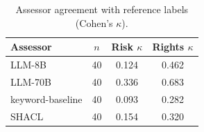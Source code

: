 \begin{table}[htbp]
\centering
\caption{Assessor agreement with reference labels (Cohen's $\kappa$).}
\label{tab:assessor_vs_gt}
\begin{tabular}{lccc}
\toprule
Assessor & $n$ & Risk $\kappa$ & Rights $\kappa$ \\
\midrule
LLM-8B & 40 & 0.124 & 0.462 \\
LLM-70B & 40 & 0.336 & 0.683 \\
keyword-baseline & 40 & 0.093 & 0.282 \\
SHACL & 40 & 0.154 & 0.320 \\
\bottomrule
\end{tabular}
\end{table}
